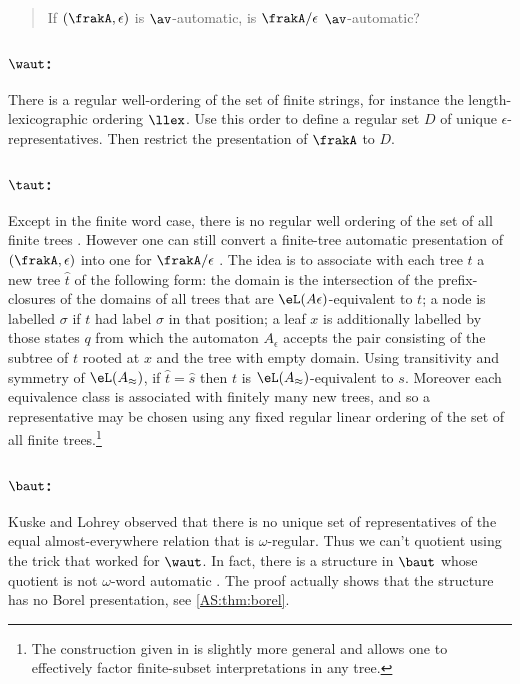 \begin{quote}
If $(\frakA,\epsilon)$ is $\av$-automatic, is $\frakA/\epsilon$ $\av$-automatic?
\end{quote}

\subsubsection*{$\waut$:}
There is a regular well-ordering of the set of finite strings, for instance the length-lexicographic
ordering $\llex$. Use this order to define a regular set $D$ of unique $\epsilon$-representatives.
Then restrict the presentation of $\frakA$ to $D$.

\subsubsection*{$\taut$:}
Except in the finite word case, there is no regular well ordering of the set of
all finite trees \cite{CL07csl}. 
However one can still convert a finite-tree automatic presentation of $(\frakA,\epsilon)$ into
one for $\frakA/\epsilon$ \cite{CL07LMCS}. The idea is to associate with each tree $t$ a
new tree $\hat{t}$ of the following form: the domain is the intersection 
of the prefix-closures of the domains of all trees that are $\eL({A}\epsilon)$-equivalent to $t$; 
a node is labelled $\sigma$ if $t$ had label $\sigma$ in that position; 
a leaf $x$ is additionally labelled by those states $q$ from which the 
automaton ${A}_{\epsilon}$ accepts the pair consisting of the subtree of $t$ 
rooted at $x$ and the tree with empty domain.
Using transitivity and symmetry of $\eL({A}_\approx)$, if $\hat{t} = \hat{s}$ 
then $t$ is $\eL({A}_\approx)$-equivalent to $s$. 
Moreover each equivalence class is associated with finitely many new trees, 
and so a representative may be chosen using any fixed regular linear ordering 
of the set of all finite trees.\footnote{The construction 
given in \cite{CL07LMCS} is slightly more general and allows one to effectively 
factor finite-subset interpretations in any tree.}



\subsubsection*{$\baut$:} %
Kuske and Lohrey \cite{} observed that there is no unique set of representatives of the equal almost-everywhere relation that is $\omega$-regular.
Thus we can't quotient using the trick that worked for $\waut$. In fact, there is a structure in $\baut$ whose quotient is not $\omega$-word 
automatic \cite{HKMN08}. The proof actually shows that the structure has no Borel presentation, see \ref{AS:thm:borel}.
 

